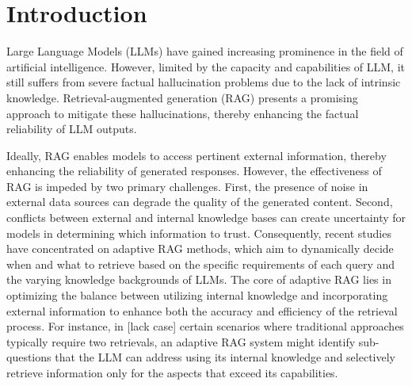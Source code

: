 \section{Introduction}

Large Language Models (LLMs) have gained increasing prominence in the field of artificial intelligence.
However, limited by the capacity and capabilities of LLM, it still suffers from severe factual hallucination problems due to the lack of intrinsic knowledge.
Retrieval-augmented generation (RAG) presents a promising approach to mitigate these hallucinations, thereby enhancing the factual reliability of LLM outputs.


 
Ideally, RAG enables models to access pertinent external information, thereby enhancing the reliability of generated responses. 
% 
However, the effectiveness of RAG is impeded by two primary challenges. 
First, the presence of noise in external data sources can degrade the quality of the generated content. 
Second, conflicts between external and internal knowledge bases can create uncertainty for models in determining which information to trust. 
% 
Consequently, recent studies have concentrated on adaptive RAG methods, which aim to dynamically decide when and what to retrieve based on the specific requirements of each query and the varying knowledge backgrounds of LLMs.
% 
The core of adaptive RAG lies in optimizing the balance between utilizing internal knowledge and incorporating external information to enhance both the accuracy and efficiency of the retrieval process.
% 
For instance, in [lack case] certain scenarios where traditional approaches typically require two retrievals, an adaptive RAG system might identify sub-questions that the LLM can address using its internal knowledge and selectively retrieve information only for the aspects that exceed its capabilities.




